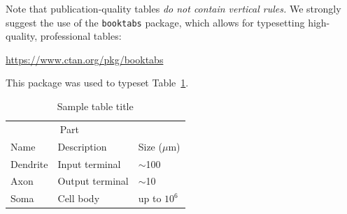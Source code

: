 \documentclass{article}
\begin{document}
Note that publication-quality tables \emph{do not contain vertical rules.} We
strongly suggest the use of the \verb+booktabs+ package, which allows for
typesetting high-quality, professional tables:
\begin{center}
  \url{https://www.ctan.org/pkg/booktabs}
\end{center}
This package was used to typeset Table~\ref{sample-table}.

\begin{table}
  \caption{Sample table title}
  \label{sample-table}
  \centering
  \begin{tabular}{lll}
    \toprule
    \multicolumn{2}{c}{Part}                   \\
    \cmidrule(r){1-2}
    Name     & Description     & Size ($\mu$m) \\
    \midrule
    Dendrite & Input terminal  & $\sim$100     \\
    Axon     & Output terminal & $\sim$10      \\
    Soma     & Cell body       & up to $10^6$  \\
    \bottomrule
  \end{tabular}
\end{table}
\end{document}
